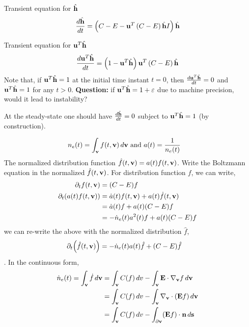 \documentclass{article}[draft]
\begin{document}
Transient equation for $\hat{\mathbf{h}}$
\begin{align*}
\frac{d \hat{\mathbf{h}}}{dt} 
= \left( C - E - \mathbf{u}^T \left( C - E \right) \hat{\mathbf{h}} I \right) \hat{\mathbf{h}}
\end{align*}

Transient equation for $\mathbf{u}^T \hat{\mathbf{h}}$
\begin{align*}
\frac{d \mathbf{u}^T \hat{\mathbf{h}}}{dt} 
= \left( 1 - \mathbf{u}^T \hat{\mathbf{h}} \right) \mathbf{u}^T \left( C - E \right) \hat{\mathbf{h}}
\end{align*}
Note that, if $\mathbf{u}^T \hat{\mathbf{h}} = 1$ at the initial time instant $t=0$, then $\frac{d \mathbf{u}^T \hat{\mathbf{h}}}{dt} = 0$ and $\mathbf{u}^T \hat{\mathbf{h}} = 1$ for any $t>0$. \textbf{Question:} if $\mathbf{u}^T \hat{\mathbf{h}} = 1+\varepsilon$ due to machine precision, would it lead to instability?


At the steady-state one should have $\frac{d \hat{\mathbf{h}}}{dt} = 0$ subject to $\mathbf{u}^T \hat{\mathbf{h}} = 1$ (by construction). 

\newpage

\begin{align*}
n_e(t) &= \int_{\mathbf{v}} f(t, \mathbf{v}) \, d\mathbf{v} \text{ and } a(t) = \frac{1}{n_e(t)}
\end{align*}
The normalized distribution function $\hat{f}(t,\mathbf{v}) = a(t) f(t, \mathbf{v})$. Write the Boltzmann equation in the normalized $\hat{f}(t, \mathbf{v})$. For distribution function $f$, we can write, 
\begin{align*}
	\partial_t f\of{t,\vect{v}} &= (C-E)f \\
	\partial_t\of{a\of{t} f\of{t,\vect{v}}} &= \dot{a}\of{t}f\of{t,\vect{v}} + a\of{t} \dot{f}\of{t,\vect{v}} \\
											&= \dot{a}\of{t}f + a\of{t} (C-E)f \\
											&= -\dot{n}_e\of{t} a^2\of{t} f + a\of{t} (C-E)f \\
\end{align*}
we can re-write the above with the normalized distribution $\hat{f}$, 
\begin{align*}
\partial_t\of{\hat{f}(t,\vect{v})} &=-\dot{n}_e\of{t} a\of{t} \hat{f} + (C-E)\hat{f}
\end{align*}. In the continuous form, 
\begin{align*}
\dot{n}_e (t) = \int_{\mathbf{v}} \dot{f} \, d\mathbf{v} &= \int_{\mathbf{v}} C(f) \, dv - \int_{\mathbf{v}} \mathbf{E} \cdot \nabla_{\mathbf{v}} f \, d\mathbf{v} \\
&= \int_{\mathbf{v}} C(f) \, dv -\int_{\mathbf{v}} \nabla_{\mathbf{v}} \cdot (\mathbf{E} f) \, d\mathbf{v} \\
&= \int_{\mathbf{v}} C(f) \, dv -\int_{\partial\mathbf{v}} (\mathbf{E} f) \cdot \mathbf{n} \, d\mathbf{s}
\end{align*}
\end{document}
